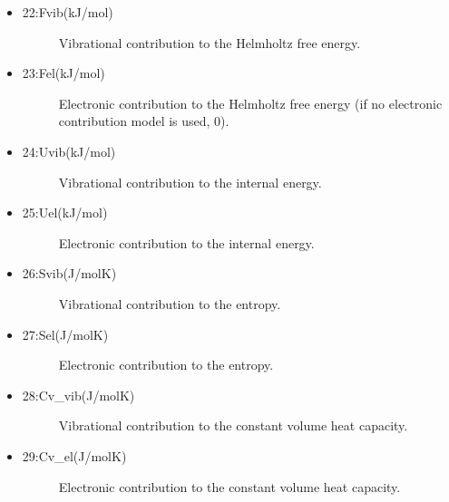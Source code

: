 \documentclass[a4paper]{article}
\begin{document}
\begin{itemize}
\begin{description}
\end{description}

\item %
\begin{description}
\item[{22:Fvib(kJ/mol)}] \leavevmode 
Vibrational contribution to the Helmholtz free energy.

\end{description}

\item %
\begin{description}
\item[{23:Fel(kJ/mol)}] \leavevmode 
Electronic contribution to the Helmholtz free energy (if no
electronic contribution model is used, 0).

\end{description}

\item %
\begin{description}
\item[{24:Uvib(kJ/mol)}] \leavevmode 
Vibrational contribution to the internal energy.

\end{description}

\item %
\begin{description}
\item[{25:Uel(kJ/mol)}] \leavevmode 
Electronic contribution to the internal energy.

\end{description}

\item %
\begin{description}
\item[{26:Svib(J/molK)}] \leavevmode 
Vibrational contribution to the entropy.

\end{description}

\item %
\begin{description}
\item[{27:Sel(J/molK)}] \leavevmode 
Electronic contribution to the entropy.

\end{description}

\item %
\begin{description}
\item[{28:Cv\_vib(J/molK)}] \leavevmode 
Vibrational contribution to the constant volume heat capacity.

\end{description}

\item %
\begin{description}
\item[{29:Cv\_el(J/molK)}] \leavevmode 
Electronic contribution to the constant volume heat capacity.

\end{description}

\end{itemize}
\end{document}
